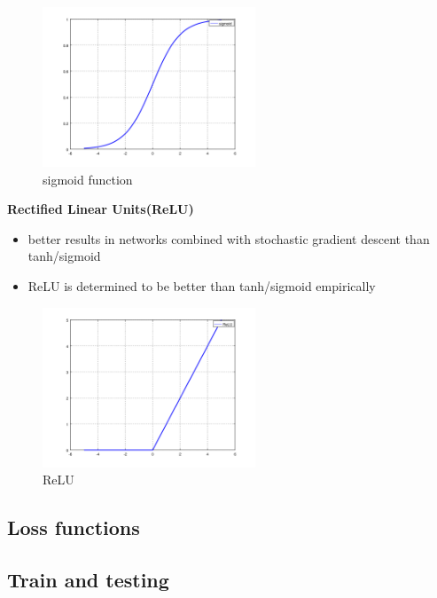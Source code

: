 \begin{figure}[h]
	\begin{center}
		\includegraphics[width=240px,height=180px]{src/img/state/sigmoid}
		\caption{sigmoid function} \label{fig:sigmoid}
    \end{center}
\end{figure}
\newpage
\textbf{Rectified Linear Units(ReLU)}
\begin{itemize}
	\item better results in networks combined with stochastic gradient descent than tanh/sigmoid\cite{imagenet}
	\item ReLU is determined to be better than tanh/sigmoid empirically
\end{itemize}

\begin{figure}[h]
	\begin{center}
		\includegraphics[width=240px,height=180px]{src/img/state/relu}
		\caption{ReLU} \label{fig:relu}
    \end{center}
\end{figure}




\subsection{Loss functions}
\label{loss}

\subsection{Train and testing}
\label{train-test}

